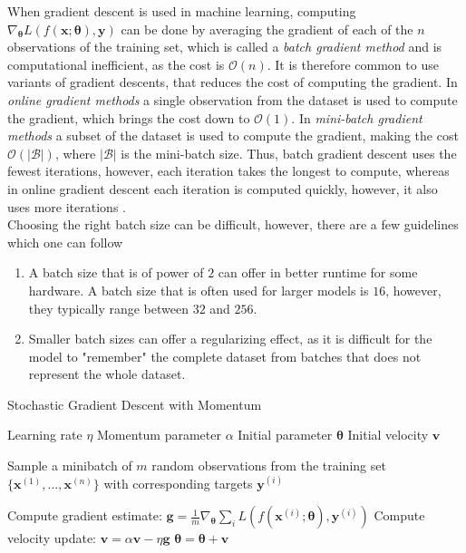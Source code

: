 \documentclass[./main.tex]{subfiles}
\begin{document}
\noindent When gradient descent is used in machine learning, computing $\nabla_{\bm{\theta}} L\left( f(\bm{x}; \bm{\theta}), \bm{y} \right)$ can be done by averaging the gradient of each of the $n$ observations of the training set, which is called a \textit{batch gradient method} and is computational inefficient, as the cost is $\mathcal{O}(n)$. It is therefore common to use variants of gradient descents, that reduces the cost of computing the gradient. In \textit{online gradient methods} a single observation from the dataset is used to compute the gradient, which brings the cost down to $\mathcal{O}(1)$. In \textit{mini-batch gradient methods} a subset of the dataset is used to compute the gradient, making the cost $\mathcal{O}(|\mathcal{B}|)$, where $|\mathcal{B}|$ is the mini-batch size. Thus, batch gradient descent uses the fewest iterations, however, each iteration takes the longest to compute, whereas in online gradient descent each iteration is computed quickly, however, it also uses more iterations  \cite{d2l}. \\
Choosing the right batch size can be difficult, however, there are a few guidelines which one can follow \cite{EML_optimization} \cite{d2l}
\begin{enumerate}
    \item A batch size that is of power of $2$ can offer in better runtime for some hardware. A batch size that is often used for larger models is $16$, however, they typically range between $32$ and $256$.
    \item Smaller batch sizes can offer a regularizing effect, as it is difficult for the model to "remember" the complete dataset from batches that does not represent the whole dataset.
\end{enumerate}
\begin{algorithm}[htbp]
    \caption{Stochastic Gradient Descent with Momentum \cite{DeepLearning}}
    \label{Algorithm:SGD_momentum}
    \begin{algorithmic}[1]
        \Require Learning rate $\eta$
        \Require Momentum parameter $\alpha$
        \Require Initial parameter $\bm{\theta}$
        \Require Initial velocity $\bm{v}$
            \State \begin{varwidth}[t]{\linewidth}
            Sample a minibatch of $m$ random observations from the training set $\{\bm{x}^{(1)}, ..., \bm{x}^{(n)}\}$ with corresponding targets $\bm{y}^{(i)}$
            \end{varwidth} 
            \State Compute gradient estimate: $\bm{g} = \frac{1}{m} \nabla_{\bm{\theta}} \sum_i L\left( f \left( \bm{x}^{(i)}; \bm{\theta} \right), \bm{y}^(i) \right)$
            \State Compute velocity update: $\bm{v} = \alpha \bm{v} - \eta \bm{g}$
            \State $\bm{\theta} = \bm{\theta} + \bm{v}$
        \EndWhile
    \end{algorithmic}
\end{algorithm}
\end{document}

